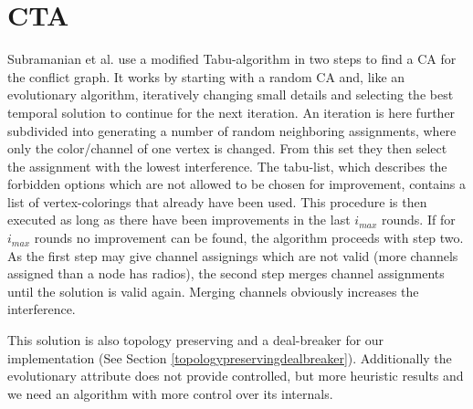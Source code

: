   \section{\ac{CTA}}
    Subramanian et al. \cite{CTA} use a modified Tabu-algorithm \cite{tabu} in two steps to find a \ac{CA} for the conflict graph.
    It works by starting with a random \ac{CA} and, like an evolutionary algorithm, 
    iteratively changing small details and selecting the best temporal solution to continue for the next iteration.
    An iteration is here further subdivided into generating a number of random neighboring assignments,
    where only the color/channel of one vertex is changed.
    From this set they then select the assignment with the lowest interference.
    The tabu-list, which describes the forbidden options which are not allowed to be chosen for improvement,
    contains a list of vertex-colorings that already have been used.
    This procedure is then executed as long as there have been improvements in the last \textit{$i_{max}$} rounds.
    If for \textit{$i_{max}$} rounds no improvement can be found, the algorithm proceeds with step two.
    As the first step may give channel assignings which are not valid (more channels assigned than a node has radios), 
    the second step merges channel assignments until the solution is valid again.
    Merging channels obviously increases the interference.
    
    This solution is also topology preserving and a deal-breaker for our implementation (See Section \ref{topologypreservingdealbreaker}).
    Additionally the evolutionary attribute does not provide controlled, but more heuristic results and we need an algorithm with more control over its internals.